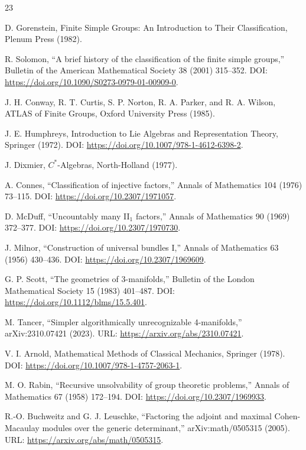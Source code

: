 \documentclass[11pt,letterpaper]{article}
\theoremstyle{definition}
\theoremstyle{remark}
\begin{document}
\begin{thebibliography}{23}

D. Gorenstein, Finite Simple Groups: An Introduction to Their Classification, Plenum Press (1982).

R. Solomon, ``A brief history of the classification of the finite simple groups,'' Bulletin of the American Mathematical Society 38 (2001) 315--352. DOI: \url{https://doi.org/10.1090/S0273-0979-01-00909-0}.

J. H. Conway, R. T. Curtis, S. P. Norton, R. A. Parker, and R. A. Wilson, ATLAS of Finite Groups, Oxford University Press (1985).

J. E. Humphreys, Introduction to Lie Algebras and Representation Theory, Springer (1972). DOI: \url{https://doi.org/10.1007/978-1-4612-6398-2}.

J. Dixmier, $C^*$-Algebras, North-Holland (1977).

A. Connes, ``Classification of injective factors,'' Annals of Mathematics 104 (1976) 73--115. DOI: \url{https://doi.org/10.2307/1971057}.

D. McDuff, ``Uncountably many II$_1$ factors,'' Annals of Mathematics 90 (1969) 372--377. DOI: \url{https://doi.org/10.2307/1970730}.

J. Milnor, ``Construction of universal bundles I,'' Annals of Mathematics 63 (1956) 430--436. DOI: \url{https://doi.org/10.2307/1969609}.

G. P. Scott, ``The geometries of 3-manifolds,'' Bulletin of the London Mathematical Society 15 (1983) 401--487. DOI: \url{https://doi.org/10.1112/blms/15.5.401}.

M. Tancer, ``Simpler algorithmically unrecognizable 4-manifolds,'' arXiv:2310.07421 (2023). URL: \url{https://arxiv.org/abs/2310.07421}.

V. I. Arnold, Mathematical Methods of Classical Mechanics, Springer (1978). DOI: \url{https://doi.org/10.1007/978-1-4757-2063-1}.

M. O. Rabin, ``Recursive unsolvability of group theoretic problems,'' Annals of Mathematics 67 (1958) 172--194. DOI: \url{https://doi.org/10.2307/1969933}.

R.-O. Buchweitz and G. J. Leuschke, ``Factoring the adjoint and maximal Cohen-Macaulay modules over the generic determinant,'' arXiv:math/0505315 (2005). URL: \url{https://arxiv.org/abs/math/0505315}.


\end{thebibliography}
\end{document}
